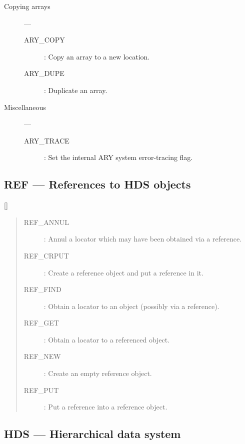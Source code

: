 \begin{description}
\item [Copying arrays] ---

\begin{description}
\item [ARY\_COPY] : Copy an array to a new location.
\item [ARY\_DUPE] : Duplicate an array.
\end{description}

\item [Miscellaneous] ---

\begin{description}
\item [ARY\_TRACE] : Set the internal ARY system error-tracing flag.
\end{description}

\end{description}

\newpage

\subsection{REF --- References to HDS objects}
\label{R_REF}

\vspace{-9mm}

\hfill []

\vspace{2mm}

\begin{quote}
\begin{description}
\item [REF\_ANNUL] : Annul a locator which may have been obtained via a reference.
\item [REF\_CRPUT] : Create a reference object and put a reference in it.
\item [REF\_FIND] : Obtain a locator to an object (possibly via a reference).
\item [REF\_GET] : Obtain a locator to a referenced object.
\item [REF\_NEW] : Create an empty reference object.
\item [REF\_PUT] : Put a reference into a reference object.
\end{description}
\end{quote}

\newpage

\subsection{HDS --- Hierarchical data system}

